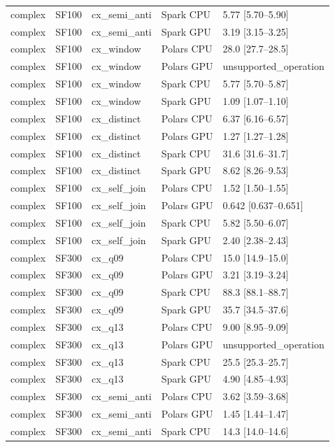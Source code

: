\begin{longtable}{lllll}
complex & SF100 & cx\_semi\_anti & Spark CPU & 5.77 [5.70--5.90] \\
complex & SF100 & cx\_semi\_anti & Spark GPU & 3.19 [3.15--3.25] \\
complex & SF100 & cx\_window & Polars CPU & 28.0 [27.7--28.5] \\
complex & SF100 & cx\_window & Polars GPU & unsupported\_operation \\
complex & SF100 & cx\_window & Spark CPU & 5.77 [5.70--5.87] \\
complex & SF100 & cx\_window & Spark GPU & 1.09 [1.07--1.10] \\
complex & SF100 & cx\_distinct & Polars CPU & 6.37 [6.16--6.57] \\
complex & SF100 & cx\_distinct & Polars GPU & 1.27 [1.27--1.28] \\
complex & SF100 & cx\_distinct & Spark CPU & 31.6 [31.6--31.7] \\
complex & SF100 & cx\_distinct & Spark GPU & 8.62 [8.26--9.53] \\
complex & SF100 & cx\_self\_join & Polars CPU & 1.52 [1.50--1.55] \\
complex & SF100 & cx\_self\_join & Polars GPU & 0.642 [0.637--0.651] \\
complex & SF100 & cx\_self\_join & Spark CPU & 5.82 [5.50--6.07] \\
complex & SF100 & cx\_self\_join & Spark GPU & 2.40 [2.38--2.43] \\
complex & SF300 & cx\_q09 & Polars CPU & 15.0 [14.9--15.0] \\
complex & SF300 & cx\_q09 & Polars GPU & 3.21 [3.19--3.24] \\
complex & SF300 & cx\_q09 & Spark CPU & 88.3 [88.1--88.7] \\
complex & SF300 & cx\_q09 & Spark GPU & 35.7 [34.5--37.6] \\
complex & SF300 & cx\_q13 & Polars CPU & 9.00 [8.95--9.09] \\
complex & SF300 & cx\_q13 & Polars GPU & unsupported\_operation \\
complex & SF300 & cx\_q13 & Spark CPU & 25.5 [25.3--25.7] \\
complex & SF300 & cx\_q13 & Spark GPU & 4.90 [4.85--4.93] \\
complex & SF300 & cx\_semi\_anti & Polars CPU & 3.62 [3.59--3.68] \\
complex & SF300 & cx\_semi\_anti & Polars GPU & 1.45 [1.44--1.47] \\
complex & SF300 & cx\_semi\_anti & Spark CPU & 14.3 [14.0--14.6] \\

\end{longtable}
